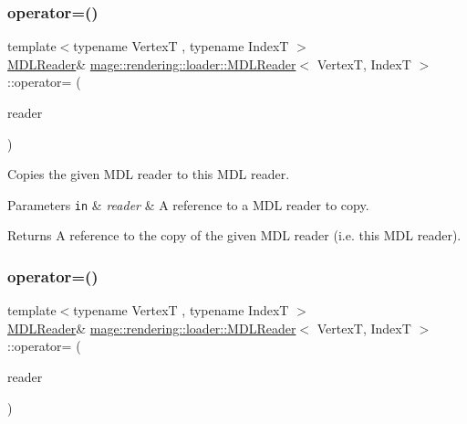 \subsubsection{\texorpdfstring{operator=()}{operator=()}\hspace{0.1cm}{\footnotesize\ttfamily [1/2]}}
{\footnotesize\ttfamily template$<$typename VertexT , typename IndexT $>$ \\
\mbox{\hyperlink{classmage_1_1rendering_1_1loader_1_1_m_d_l_reader}{M\+D\+L\+Reader}}\& \mbox{\hyperlink{classmage_1_1rendering_1_1loader_1_1_m_d_l_reader}{mage\+::rendering\+::loader\+::\+M\+D\+L\+Reader}}$<$ VertexT, IndexT $>$\+::operator= (\begin{DoxyParamCaption}\item[{const \mbox{\hyperlink{classmage_1_1rendering_1_1loader_1_1_m_d_l_reader}{M\+D\+L\+Reader}}$<$ VertexT, IndexT $>$ \&}]{reader }\end{DoxyParamCaption})\hspace{0.3cm}{\ttfamily [delete]}}

Copies the given M\+DL reader to this M\+DL reader.


\begin{DoxyParams}[1]{Parameters}
\mbox{\tt in}  & {\em reader} & A reference to a M\+DL reader to copy. \\
\hline
\end{DoxyParams}
\begin{DoxyReturn}{Returns}
A reference to the copy of the given M\+DL reader (i.\+e. this M\+DL reader). 
\end{DoxyReturn}
\mbox{\label{classmage_1_1rendering_1_1loader_1_1_m_d_l_reader_a2afa24fc79ecdcf15f0cbf09f7a78e52}} 
\subsubsection{\texorpdfstring{operator=()}{operator=()}\hspace{0.1cm}{\footnotesize\ttfamily [2/2]}}
{\footnotesize\ttfamily template$<$typename VertexT , typename IndexT $>$ \\
\mbox{\hyperlink{classmage_1_1rendering_1_1loader_1_1_m_d_l_reader}{M\+D\+L\+Reader}}\& \mbox{\hyperlink{classmage_1_1rendering_1_1loader_1_1_m_d_l_reader}{mage\+::rendering\+::loader\+::\+M\+D\+L\+Reader}}$<$ VertexT, IndexT $>$\+::operator= (\begin{DoxyParamCaption}\item[{\mbox{\hyperlink{classmage_1_1rendering_1_1loader_1_1_m_d_l_reader}{M\+D\+L\+Reader}}$<$ VertexT, IndexT $>$ \&\&}]{reader }\end{DoxyParamCaption})\hspace{0.3cm}{\ttfamily [delete]}}

